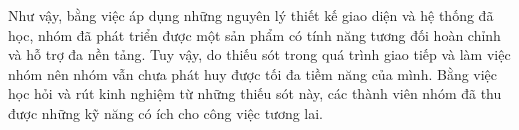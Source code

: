 \documentclass[./../main.tex]{subfiles}
\begin{document}
Như vậy, bằng việc áp dụng những nguyên lý thiết kế giao diện và hệ thống đã học, nhóm đã phát triển được một sản phẩm có tính năng tương đối hoàn chỉnh và hỗ trợ đa nền tảng. Tuy vậy, do thiếu sót trong quá trình giao tiếp và làm việc nhóm nên nhóm vẫn chưa phát huy được tối đa tiềm năng của mình. Bằng việc học hỏi và rút kinh nghiệm từ những thiếu sót này, các thành viên nhóm đã thu được những kỹ năng có ích cho công việc tương lai.
\end{document}
